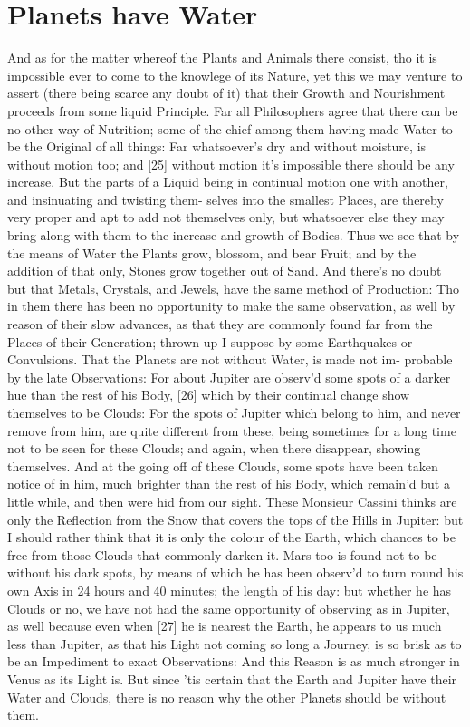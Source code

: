 \documentclass[letterpaper]{book}
\begin{document}
\section{Planets have Water}

And as for the matter whereof the Plants and Animals there consist, tho it
is impossible ever to come to the knowlege of its Nature, yet this we may
venture to assert (there being scarce any doubt of it) that their Growth and
Nourishment proceeds from some liquid Principle. Far all Philosophers agree
that there can be no other way of Nutrition; some of the chief among them
having made Water to be the Original of all things: Far whatsoever's dry and
without moisture, is without motion too; and [25] without motion it's
impossible there should be any increase. But the parts of a Liquid being in
continual motion one with another, and insinuating and twisting them- selves
into the smallest Places, are thereby very proper and apt to add not
themselves only, but whatsoever else they may bring along with them to the
increase and growth of Bodies. Thus we see that by the means of Water the
Plants grow, blossom, and bear Fruit; and by the addition of that only,
Stones grow together out of Sand. And there's no doubt but that Metals,
Crystals, and Jewels, have the same method of Production: Tho in them there
has been no opportunity to make the same observation, as well by reason of
their slow advances, as that they are commonly found far from the Places of
their Generation; thrown up I suppose by some Earthquakes or Convulsions.
That the Planets are not without Water, is made not im- probable by the late
Observations: For about Jupiter are observ'd some spots of a darker hue than
the rest of his Body, [26] which by their continual change show themselves
to be Clouds: For the spots of Jupiter which belong to him, and never remove
from him, are quite different from these, being sometimes for a long time
not to be seen for these Clouds; and again, when there disappear, showing
themselves. And at the going off of these Clouds, some spots have been taken
notice of in him, much brighter than the rest of his Body, which remain'd
but a little while, and then were hid from our sight. These Monsieur Cassini
thinks are only the Reflection from the Snow that covers the tops of the
Hills in Jupiter: but I should rather think that it is only the colour of
the Earth, which chances to be free from those Clouds that commonly darken
it.  Mars too is found not to be without his dark spots, by means of which
he has been observ'd to turn round his own Axis in 24 hours and 40 minutes;
the length of his day: but whether he has Clouds or no, we have not had the
same opportunity of observing as in Jupiter, as well because even when [27]
he is nearest the Earth, he appears to us much less than Jupiter, as that
his Light not coming so long a Journey, is so brisk as to be an Impediment
to exact Observations: And this Reason is as much stronger in Venus as its
Light is. But since 'tis certain that the Earth and Jupiter have their Water
and Clouds, there is no reason why the other Planets should be without them.
\end{document}
